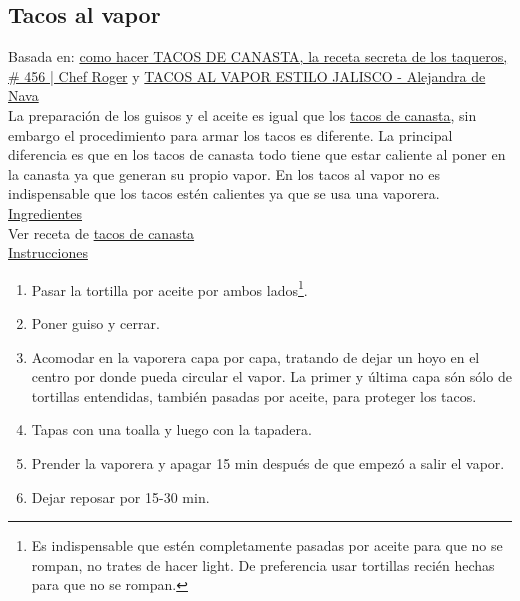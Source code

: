 \subsection{Tacos al vapor}
\label{sec:tacos-al-vapor}

Basada en: \href{https://www.youtube.com/watch?v=kH0nLhOtY2s}{como hacer TACOS DE CANASTA, la receta secreta de los taqueros, \# 456 | Chef Roger} y \href{https://www.youtube.com/watch?v=PoDRiJ3zVmc}{TACOS AL VAPOR ESTILO JALISCO - Alejandra de Nava}\\

La preparación de los guisos y el aceite es igual que los  \href{sec:tacos-de-canasta}{tacos de canasta}, sin embargo el procedimiento para armar los tacos es diferente. La principal diferencia es que en los tacos de canasta todo tiene que estar caliente al poner en la canasta ya que generan su propio vapor. En los tacos al vapor no es indispensable que los tacos estén calientes ya que se usa una vaporera.\\

\underline{Ingredientes}\\
Ver receta de \href{sec:tacos-de-canasta}{tacos de canasta}\\

\underline{Instrucciones}

\begin{enumerate}
\item Pasar la tortilla por aceite por ambos lados\footnote{Es indispensable que estén completamente pasadas por aceite para que no se rompan, no trates de hacer light. De preferencia usar tortillas recién hechas para que no se rompan.}. 
\item Poner guiso y cerrar.
\item Acomodar en la vaporera capa por capa, tratando de dejar un hoyo en el centro por donde pueda circular el vapor. La primer y última capa són sólo de tortillas entendidas, también pasadas por aceite, para proteger los tacos.
\item Tapas con una toalla y luego con la tapadera.
\item Prender la vaporera y apagar 15 min después de que empezó a salir el vapor.
\item Dejar reposar por 15-30 min.
\end{enumerate}

